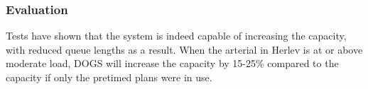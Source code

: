 

\subsubsection*{Evaluation}

Tests have shown that the system is indeed capable of increasing the
capacity, with reduced queue lengths as a result. When the arterial in
Herlev is at or above moderate load, DOGS will increase the capacity by
15-25\% compared to the capacity if only the pretimed plans were in
use.

